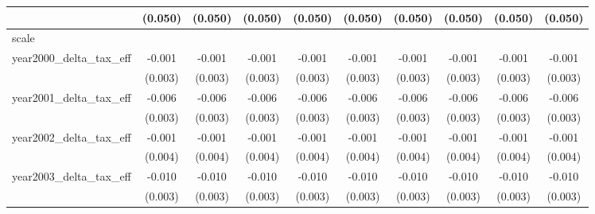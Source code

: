 {\begin{tabular}{l*{9}{c}}
            &     (0.050)         &     (0.050)         &     (0.050)         &     (0.050)         &     (0.050)         &     (0.050)         &     (0.050)         &     (0.050)         &     (0.050)         \\
\hline
scale       &                     &                     &                     &                     &                     &                     &                     &                     &                     \\
year2000_delta_tax_eff&      -0.001         &      -0.001         &      -0.001         &      -0.001         &      -0.001         &      -0.001         &      -0.001         &      -0.001         &      -0.001         \\
            &     (0.003)         &     (0.003)         &     (0.003)         &     (0.003)         &     (0.003)         &     (0.003)         &     (0.003)         &     (0.003)         &     (0.003)         \\
[1em]
year2001_delta_tax_eff&      -0.006\sym{*}  &      -0.006\sym{*}  &      -0.006\sym{*}  &      -0.006\sym{*}  &      -0.006\sym{*}  &      -0.006\sym{*}  &      -0.006\sym{*}  &      -0.006\sym{*}  &      -0.006\sym{*}  \\
            &     (0.003)         &     (0.003)         &     (0.003)         &     (0.003)         &     (0.003)         &     (0.003)         &     (0.003)         &     (0.003)         &     (0.003)         \\
[1em]
year2002_delta_tax_eff&      -0.001         &      -0.001         &      -0.001         &      -0.001         &      -0.001         &      -0.001         &      -0.001         &      -0.001         &      -0.001         \\
            &     (0.004)         &     (0.004)         &     (0.004)         &     (0.004)         &     (0.004)         &     (0.004)         &     (0.004)         &     (0.004)         &     (0.004)         \\
[1em]
year2003_delta_tax_eff&      -0.010\sym{***}&      -0.010\sym{***}&      -0.010\sym{***}&      -0.010\sym{***}&      -0.010\sym{***}&      -0.010\sym{***}&      -0.010\sym{***}&      -0.010\sym{***}&      -0.010\sym{***}\\
            &     (0.003)         &     (0.003)         &     (0.003)         &     (0.003)         &     (0.003)         &     (0.003)         &     (0.003)         &     (0.003)         &     (0.003)         \\
[1em]

\end{tabular}}
